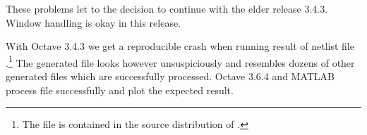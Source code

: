 These problems let to the decision to continue with the elder release
3.4.3. Window handling is okay in this release.

With Octave 3.4.3 we get a reproducible crash when running result 
of netlist file
.\footnote{The file is
contained in the source distribution of \linnet{}.} The \linnet{}
generated file  looks however unsuspiciously and resembles
dozens of other generated files which are successfully processed. Octave
3.6.4 and MATLAB process file  successfully and plot the
expected result.
